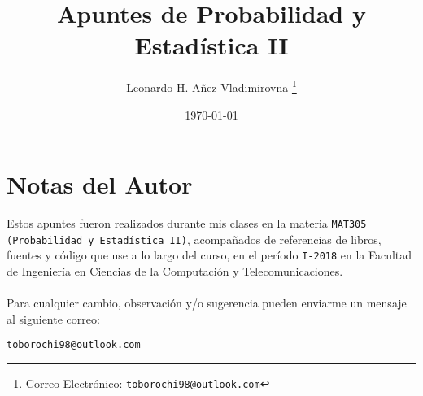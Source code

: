 

\title{Apuntes de Probabilidad y Estadística II}

\author{Leonardo H. Añez Vladimirovna%
  \thanks{Correo Electrónico: \texttt{toborochi98@outlook.com}}}
\date{\today}

\maketitle


\section*{Notas del Autor}
Estos apuntes fueron realizados durante mis clases en la materia \texttt{MAT305 (Probabilidad y Estadística II)}, acompañados de referencias de libros, fuentes y código que use a lo largo del curso, en el período \texttt{I-2018} en la Facultad de Ingeniería en Ciencias de la Computación y Telecomunicaciones. 
\\ \vspace{0.5cm} \\
Para cualquier cambio, observación y/o sugerencia pueden enviarme un mensaje al siguiente correo:
\begin{center}
 \texttt{toborochi98@outlook.com}
\end{center}

\tableofcontents
